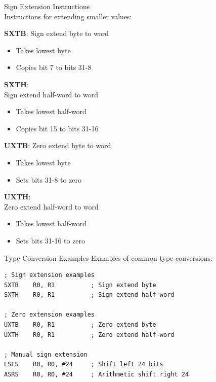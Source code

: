 \begin{concept}{Sign Extension Instructions}\\
Instructions for extending smaller values:

\begin{minipage}{0.5\textwidth}
\textbf{SXTB}: Sign extend byte to word
    \begin{itemize}
      \item Takes lowest byte
      \item Copies bit 7 to bits 31-8
    \end{itemize}
\textbf{SXTH}: \\Sign extend half-word to word
    \begin{itemize}
      \item Takes lowest half-word
      \item Copies bit 15 to bits 31-16
    \end{itemize}
\end{minipage}
\begin{minipage}{0.5\textwidth}
\textbf{UXTB}: Zero extend byte to word
    \begin{itemize}
      \item Takes lowest byte
      \item Sets bits 31-8 to zero
    \end{itemize}
\textbf{UXTH}:\\ Zero extend half-word to word
    \begin{itemize}
      \item Takes lowest half-word
      \item Sets bits 31-16 to zero
    \end{itemize}
\end{minipage}
\end{concept}

\begin{example2}{Type Conversion Examples}
Examples of common type conversions:
\begin{lstlisting}[language=armasm, style=basesmol]
; Sign extension examples
SXTB    R0, R1          ; Sign extend byte
SXTH    R0, R1          ; Sign extend half-word

; Zero extension examples
UXTB    R0, R1          ; Zero extend byte
UXTH    R0, R1          ; Zero extend half-word

; Manual sign extension
LSLS    R0, R0, #24     ; Shift left 24 bits
ASRS    R0, R0, #24     ; Arithmetic shift right 24
\end{lstlisting}
\end{example2}

